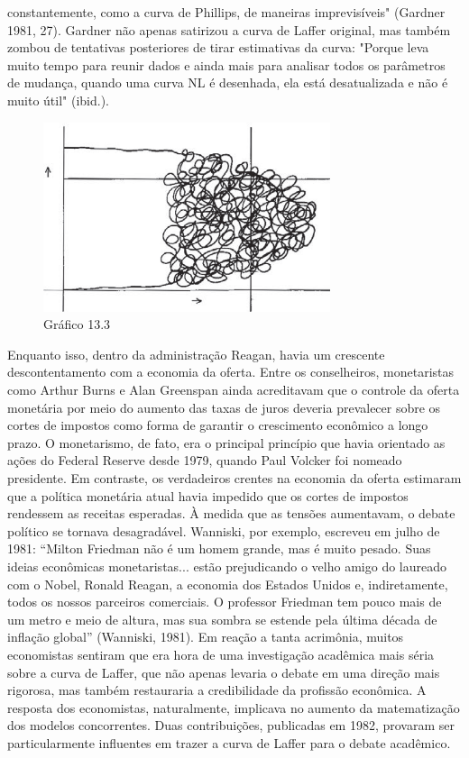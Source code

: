 \documentclass[a4paper,12pt]{article}[abntex2]
\begin{document}
constantemente, como a curva de Phillips, de maneiras imprevisíveis" (Gardner 1981, 27). Gardner não apenas satirizou a curva de Laffer original, mas também zombou de tentativas posteriores de tirar estimativas da curva: "Porque leva muito tempo para reunir dados e ainda mais para analisar todos os parâmetros de mudança, quando uma curva NL é desenhada, ela está desatualizada e não é muito útil" (ibid.).

\begin{figure}[H]
    \centering
    \caption{Gráfico 13.3}
    \includegraphics[width=0.75\textwidth]{4º Período/História do Pensamento Econômico/Tradução HPE/Tradução Tópico 9.3/figura 3.png}
    \end{figure}

Enquanto isso, dentro da administração Reagan, havia um crescente descontentamento com a economia da oferta. Entre os conselheiros, monetaristas como Arthur Burns e Alan Greenspan ainda acreditavam que o controle da oferta monetária por meio do aumento das taxas de juros deveria prevalecer sobre os cortes de impostos como forma de garantir o crescimento econômico a longo prazo. O monetarismo, de fato, era o principal princípio que havia orientado as ações do Federal Reserve desde 1979, quando Paul Volcker foi nomeado presidente. Em contraste, os verdadeiros crentes na economia da oferta estimaram que a política monetária atual havia impedido que os cortes de impostos rendessem as receitas esperadas. À medida que as tensões aumentavam, o debate político se tornava desagradável. Wanniski, por exemplo, escreveu em julho de 1981: “Milton Friedman não é um homem grande, mas é muito pesado. Suas ideias econômicas monetaristas... estão prejudicando o velho amigo do laureado com o Nobel, Ronald Reagan, a economia dos Estados Unidos e, indiretamente, todos os nossos parceiros comerciais. O professor Friedman tem pouco mais de um metro e meio de altura, mas sua sombra se estende pela última década de inflação global” (Wanniski, 1981). Em reação a tanta acrimônia, muitos economistas sentiram que era hora de uma investigação acadêmica mais séria sobre a curva de Laffer, que não apenas levaria o debate em uma direção mais rigorosa, mas também restauraria a credibilidade da profissão econômica. A resposta dos economistas, naturalmente, implicava no aumento da matematização dos modelos concorrentes. Duas contribuições, publicadas em 1982, provaram ser particularmente influentes em trazer a curva de Laffer para o debate acadêmico.
\end{document}
